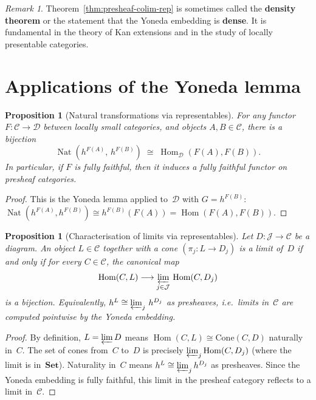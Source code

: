 \documentclass[a4paper,12pt]{book}
\DeclareMathOperator{\Hom}{Hom}
\DeclareMathOperator{\Nat}{Nat}
\newcommand{\Set}{\mathbf{Set}}
\theoremstyle{definition}
\theoremstyle{plain}
\newtheorem{proposition}[definition]{Proposition}
\theoremstyle{remark}
\newtheorem{remark}[definition]{Remark}
\begin{document}
\begin{remark}\label{rem:density}
Theorem~\ref{thm:presheaf-colim-rep} is sometimes called the
\textbf{density theorem} or the statement that the Yoneda embedding
is \textbf{dense}.  It is fundamental in the theory of Kan extensions
and in the study of locally presentable categories.
\end{remark}


\section{Applications of the Yoneda lemma}\label{sec:yoneda-applications}

\begin{proposition}[Natural transformations via representables]%
\label{prop:nat-trans-representable}
For any functor $F\colon\mathcal{C}\to\mathcal{D}$ between locally small
categories, and objects $A,B\in\mathcal{C}$, there is a bijection
\[
    \Nat(h^{F(A)},\, h^{F(B)}) \;\cong\; \Hom_{\mathcal{D}}(F(A),F(B)).
\]
In particular, if $F$ is fully faithful, then it induces a fully faithful
functor on presheaf categories.
\end{proposition}

\begin{proof}
This is the Yoneda lemma applied to~$\mathcal{D}$ with
$G = h^{F(B)}$:
$\Nat(h^{F(A)},h^{F(B)})\cong h^{F(B)}(F(A)) = \Hom(F(A),F(B))$.
\end{proof}

\begin{proposition}[Characterisation of limits via representables]%
\label{prop:limit-representable}
Let $D\colon\mathcal{J}\to\mathcal{C}$ be a diagram.  An object
$L\in\mathcal{C}$ together with a cone $(\pi_j\colon L\to D_j)$ is a
limit of~$D$ if and only if for every $C\in\mathcal{C}$, the canonical map
\[
    \Hom(C,L) \longrightarrow \varprojlim_{j\in\mathcal{J}}\,\Hom(C,D_j)
\]
is a bijection.  Equivalently, $h^L\cong\varprojlim_j\, h^{D_j}$
as presheaves, i.e.\ limits in~$\mathcal{C}$ are computed pointwise
by the Yoneda embedding.
\end{proposition}

\begin{proof}
By definition, $L = \varprojlim D$ means
$\Hom(C,L)\cong\mathrm{Cone}(C,D)$ naturally in~$C$.
The set of cones from~$C$ to~$D$ is precisely
$\varprojlim_j\Hom(C,D_j)$ (where the limit is in~$\Set$).
Naturality in~$C$ means $h^L\cong\varprojlim_j h^{D_j}$ as presheaves.
Since the Yoneda embedding is fully faithful, this limit in the
presheaf category reflects to a limit in~$\mathcal{C}$.
\end{proof}
\end{document}
